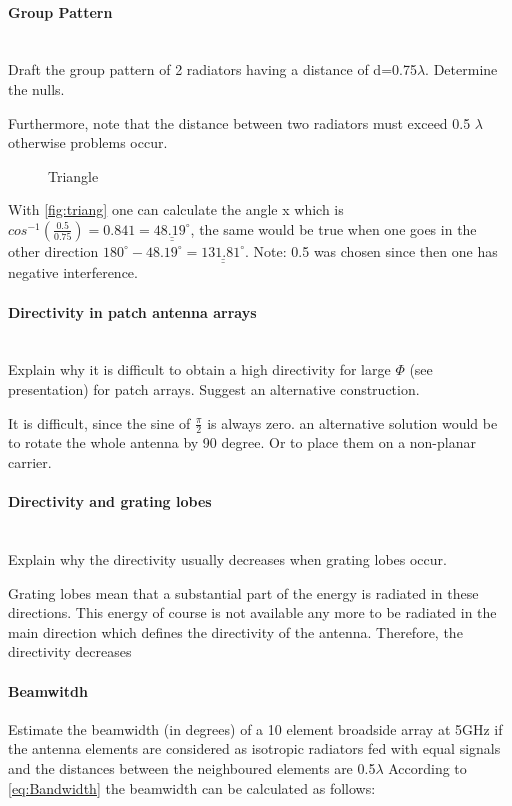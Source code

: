 \paragraph{Group Pattern}\mbox{}\\
Draft the group pattern of 2 radiators having a distance of d=0.75$\lambda$. Determine the nulls.\newline

Furthermore, note that the distance between two radiators must exceed 0.5 $\lambda$ otherwise problems occur.
\begin{figure}[ht]
  \centering
  \caption{Triangle}
  \label{fig:triang}
\end{figure}
With \autoref{fig:triang} one can calculate the angle x which is $cos^{-1}(\frac{0.5}{0.75})=0.841=\underline{\underline{48.19^{\circ}}}$, the same would be true when one goes in the other direction $180^{\circ}-48.19^{\circ}=\underline{\underline{131.81^{\circ}}}$. Note: 0.5 was chosen since then one has negative interference.


\paragraph{Directivity in patch antenna arrays}\mbox{}\\
Explain why it is difficult to obtain a high directivity for large $\Phi$ (see presentation) for patch
arrays. Suggest an alternative construction.\newline

It is difficult, since the sine of $\frac{\pi}{2}$ is always zero. an alternative solution would be to rotate the whole antenna by 90 degree. Or to place them on a non-planar carrier.
\paragraph{Directivity and grating lobes}\mbox{}\\
Explain why the directivity usually decreases when grating lobes occur.

Grating lobes mean that a substantial part of the energy is radiated in these directions. This energy of course is not available any more to be radiated in the main direction which defines the directivity of the antenna. Therefore, the directivity decreases
\paragraph{Beamwitdh}
Estimate the beamwidth (in degrees) of a 10 element broadside array at 5GHz if the antenna elements are considered as isotropic radiators fed with equal signals and the distances between the neighboured elements are 0.5$\lambda$ \newline
According to \autoref{eq:Bandwidth} the beamwidth can be calculated as follows:

